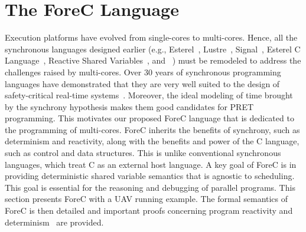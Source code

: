 \section{The ForeC Language}
\label{sec:forec}
Execution platforms have evolved from single-cores to multi-cores. 
Hence, all the synchronous languages designed earlier (e.g., 
Esterel~\cite{timed_esterel}, Lustre~\cite{timed_lustre},  
Signal~\cite{timed_signal}, Esterel C Language~\cite{timed_ecl}, 
Reactive Shared Variables~\cite{timed_reactivec_shared_variables}, 
and \pretc{}~\cite{pret_pretc}) must be remodeled to 
address the challenges raised by multi-cores. Over 30 years of
synchronous programming languages have demonstrated that they
are very well suited to the design of safety-critical real-time
systems~\cite{BriereRPC95,SouyrisPHJBH05}. Moreover, the ideal modeling of 
time brought by the synchrony hypothesis makes them good 
candidates for PRET programming. This motivates our proposed
ForeC language that is dedicated to the programming of multi-cores. 
ForeC inherits the benefits of synchrony, such as determinism
and reactivity, along with the benefits and power of the C language, 
such as control and data structures. This is unlike conventional
synchronous languages, which treat C as an external host language.
A key goal of ForeC is in providing deterministic shared variable
semantics that is agnostic to scheduling. This goal
is essential for the reasoning and debugging of parallel
programs. This section presents ForeC with a 
UAV running example. The formal
semantics of ForeC is then detailed and important proofs
concerning program reactivity and 
determinism~\cite{Maraninchi92,Tardieu07} are provided.

